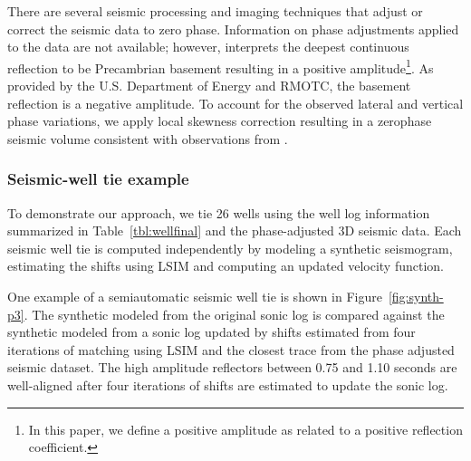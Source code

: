 There are several seismic processing and imaging techniques that adjust or correct the seismic data to zero phase. Information on phase adjustments applied to the data are not available; however, \cite{harbert2012} interprets the deepest continuous reflection to be Precambrian basement resulting in a positive amplitude\footnote{In this paper, we define a positive amplitude as related to a positive reflection coefficient.}. As provided by the U.S. Department of Energy and RMOTC, the basement reflection is a negative amplitude. To account for the observed lateral and vertical phase variations, we apply local skewness correction \cite[]{fomel2014local} resulting in a zero\new{-}phase seismic volume consistent with observations from \cite{harbert2012}.

\subsubsection{Seismic-well tie example}
To demonstrate our approach, we tie 26 wells using the well log information summarized in Table~\ref{tbl:wellfinal} and the phase-adjusted 3D seismic data. Each seismic well tie is computed independently by modeling a synthetic seismogram, estimating the shifts using LSIM and computing an updated velocity function.

One example of a semiautomatic seismic well tie is shown in Figure~\ref{fig:synth-p3}. The synthetic modeled from the original sonic log is compared against the synthetic modeled from a sonic log updated by shifts estimated from four iterations of matching using LSIM and the closest trace from the phase adjusted seismic dataset. The high amplitude reflectors between 0.75 and 1.10 seconds are well-aligned after four iterations of shifts are estimated to update the sonic log.


